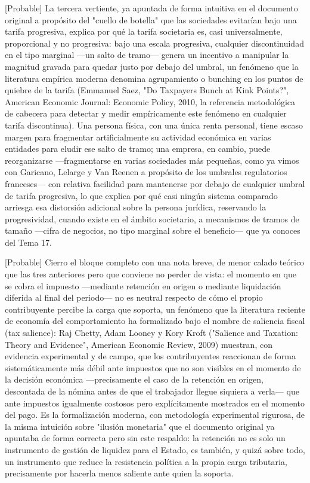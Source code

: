 \documentclass[10pt,a4paper]{article}
\begin{document}
[Probable] La tercera vertiente, ya apuntada de forma intuitiva en el documento original a propósito del "cuello de botella" que las sociedades evitarían bajo una tarifa progresiva, explica por qué la tarifa societaria es, casi universalmente, proporcional y no progresiva: bajo una escala progresiva, cualquier discontinuidad en el tipo marginal —un salto de tramo— genera un incentivo a manipular la magnitud gravada para quedar justo por debajo del umbral, un fenómeno que la literatura empírica moderna denomina agrupamiento o bunching en los puntos de quiebre de la tarifa (Emmanuel Saez, "Do Taxpayers Bunch at Kink Points?", American Economic Journal: Economic Policy, 2010, la referencia metodológica de cabecera para detectar y medir empíricamente este fenómeno en cualquier tarifa discontinua). Una persona física, con una única renta personal, tiene escaso margen para fragmentar artificialmente su actividad económica en varias entidades para eludir ese salto de tramo; una empresa, en cambio, puede reorganizarse —fragmentarse en varias sociedades más pequeñas, como ya vimos con Garicano, Lelarge y Van Reenen a propósito de los umbrales regulatorios franceses— con relativa facilidad para mantenerse por debajo de cualquier umbral de tarifa progresiva, lo que explica por qué casi ningún sistema comparado arriesga esa distorsión adicional sobre la persona jurídica, reservando la progresividad, cuando existe en el ámbito societario, a mecanismos de tramos de tamaño —cifra de negocios, no tipo marginal sobre el beneficio— que ya conoces del Tema 17.

[Probable] Cierro el bloque completo con una nota breve, de menor calado teórico que las tres anteriores pero que conviene no perder de vista: el momento en que se cobra el impuesto —mediante retención en origen o mediante liquidación diferida al final del periodo— no es neutral respecto de cómo el propio contribuyente percibe la carga que soporta, un fenómeno que la literatura reciente de economía del comportamiento ha formalizado bajo el nombre de saliencia fiscal (tax salience): Raj Chetty, Adam Looney y Kory Kroft ("Salience and Taxation: Theory and Evidence", American Economic Review, 2009) muestran, con evidencia experimental y de campo, que los contribuyentes reaccionan de forma sistemáticamente más débil ante impuestos que no son visibles en el momento de la decisión económica —precisamente el caso de la retención en origen, descontada de la nómina antes de que el trabajador llegue siquiera a verla— que ante impuestos igualmente costosos pero explícitamente mostrados en el momento del pago. Es la formalización moderna, con metodología experimental rigurosa, de la misma intuición sobre "ilusión monetaria" que el documento original ya apuntaba de forma correcta pero sin este respaldo: la retención no es solo un instrumento de gestión de liquidez para el Estado, es también, y quizá sobre todo, un instrumento que reduce la resistencia política a la propia carga tributaria, precisamente por hacerla menos saliente ante quien la soporta.
\end{document}
